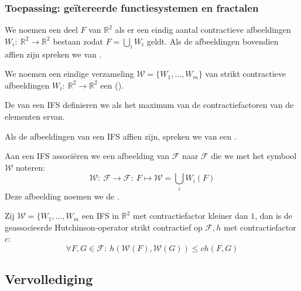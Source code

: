 \documentclass[main.tex]{subfiles}
\begin{document}
\subsubsection{Toepassing: ge\"itereerde functiesystemen en fractalen}
\label{sec:toep-geit-funct}

\begin{de}
  We noemen een deel $F$ van $\mathbb{R}^{2}$  als er een eindig aantal contractieve afbeeldingen $W_{i}:\ \mathbb{R}^{2} \rightarrow \mathbb{R}^{2}$ bestaan zodat $F = \bigcup_{i}W_{i}$ geldt.
  Als de afbeeldingen bovendien affien zijn spreken we van .
\end{de}

\begin{de}
  We noemen een eindige verzameling $\mathcal{W} = \{ W_{1}, \dotsc, W_{m}\}$ van strikt contractieve afbeeldingen $W_{i}:\ \mathbb{R}^{2}\rightarrow \mathbb{R}^{2}$ een  ().
\end{de}

\begin{de}
  De  van een IFS definieren we als het maximum van de contractiefactoren van de elementen ervan.
\end{de}

\begin{de}
  Als de afbeeldingen van een IFS affien zijn, spreken we van een .
\end{de}

\begin{de}
  Aan een IFS associ\"eren we een afbeelding van $\mathcal{F}$ naar $\mathcal{F}$ die we met het symbool $\mathcal{W}$ noteren:
  \[ \mathcal{W}:\ \mathcal{F} \rightarrow \mathcal{F}:\ F \mapsto \mathcal{W} = \bigcup_{i}W_{i}(F) \]
  Deze afbeelding noemen we de .
\end{de}

\begin{bpr}
  Zij $\mathcal{W} = \{ W_{1}, \dotsc, W_{m}$ een IFS in $\mathbb{R}^{2}$ met contractiefactor kleiner dan $1$, dan is de geassocieerde Hutchinson-operator strikt contractief op $\mathcal{F},h$ met contractiefactor $c$:
  \[ \forall F,G \in \mathcal{F}:\ h\left(\mathcal{W}(F), \mathcal{W}(G)\right) \le c h(F,G) \]
\end{bpr}


\subsection{Vervollediging}
\label{sec:vervollediging}
\end{document}
